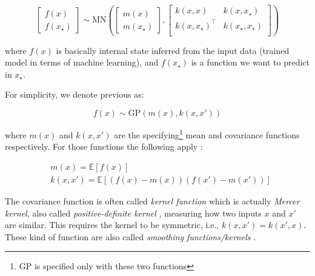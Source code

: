 \documentclass[
  digital, %
  oneside, %
  lof,     %
  lot,     %
]{fithesis4}
\begin{document}
\begin{equation}
    \begin{bmatrix}
      f(x) \\ f(x_\star)
    \end{bmatrix} \sim \text{MN}\left(
    \begin{bmatrix}
      m(x) \\ m(x_\star)
    \end{bmatrix},
    \begin{bmatrix}
      k(x, x) & k(x, x_\star) \\ 
      k(x, x_\star)^\top & k(x_\star, x_\star) \\ 
    \end{bmatrix}
  \right)
\end{equation}

where $f(x)$ is basically internal state inferred from the input data (trained model in terms of machine learning), and $f(x_\star)$ is a function we want to predict in $x_\star$.

For simplicity, we denote previous as:

\begin{equation}
  f(x) \sim \text{GP} \left( m \left( x \right), k \left( x, x' \right) \right)
\end{equation}

where $m \left( x \right)$ and $k\left( x, x' \right)$ are 
the specifying\footnote{GP is specified only with these two functions} mean and
covariance functions respectively.
For those functions the following apply \cite{rasmussen2004}:

\begin{equation}
\begin{split}
  & m(x) = \mathbb{E} \left[ f(x) \right] \\
  & k \left( x, x' \right) = \mathbb{E} \left[ 
    \left( f \left( x \right) - m \left( x \right) \right)
    \left( f \left( x' \right) - m \left( x' \right) \right)
  \right]
\end{split}
\end{equation}

The covariance function is often called \textit{kernel function} which is actually \textit{Mercer kernel}, also called \textit{positive-definite kernel} \cite{murphy2021}, measuring how two inputs $x$ and $x'$ are similar.
This requires the kernel to be symmetric, i.e., $k \left( x, x' \right) = k \left( x', x \right)$.
These kind of function are also called \textit{smoothing functions/kernels} \cite{martin2016}.
\end{document}
